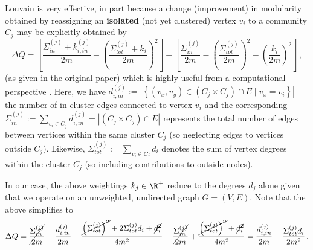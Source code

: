 \documentclass[12pt, a4paper]{article}
\begin{document}
  Louvain is very effective, in part because a change (improvement) in modularity obtained by reassigning an \textbf{isolated} (not yet clustered) vertex $v_i$ to a community $C_j$ may be explicitly obtained by
  \begin{equation}
    \Delta Q=\left[ \frac{\Sigma_{in}^{(j)} + k_{i,in}^{(j)}}{2 m} - \left(\frac{\Sigma_{tot}^{(j)} + k_{i}}{2m}\right)^2 \right] - \left[ \frac{\Sigma_{in}^{(j)}}{2m} - \left(\frac{\Sigma_{tot}^{(j)}}{2m}\right)^2 - \left(\frac{k_i}{2m}\right)^2 \right] \,,
    \label{eq:blondel-deltaQ}
  \end{equation}
  (as given in the original paper) which is highly useful from a computational perspective \parencite{lambiotte-louvain-clustering}.
  Here, we have $d_{i,in}^{(j)} := \left|\left\{(v_x, v_y) \in (C_j \times C_j) \cap E \;\big|\; v_x = v_i\right\}\right|$ the number of in-cluster edges connected to vertex $v_i$ and the corresponding $\Sigma_{in}^{(j)} := \sum_{v_i \in C_j} d_{i,in}^{(j)} = \left|(C_j \times C_j) \cap E\right|$ represents the total number of edges between vertices within the same cluster $C_j$ (so neglecting edges to vertices outside $C_j$).
  Likewise, $\Sigma_{tot}^{(j)} := \sum_{v_i \in C_j} d_i$ denotes the sum of vertex degrees within the cluster $C_j$ (so including contributions to outside nodes).

  In our case, the above weightings $k_j \in \R^+$ reduce to the degrees $d_j$ alone given that we operate on an unweighted, undirected graph $G = (V, E)$. Note that the above  simplifies to
  \begin{equation}
    \Delta Q = \cancel{\frac{\Sigma_{in}^{(j)}}{2m}} + \frac{d_{i, in}^{(j)}}{2m} - \frac{\cancel{\left(\Sigma_{tot}^{(j)}\right)^2} + 2 \Sigma_{tot}^{(j)} d_i + \cancel{d_i^2}}{4m^2} - \cancel{\frac{\Sigma_{in}^{(j)}}{2m}} + \frac{\cancel{\left(\Sigma_{tot}^{(j)}\right)^2} + \cancel{d_i^2}}{4m^2} = \frac{d_{i, in}^{(j)}}{2m} - \frac{\Sigma_{tot}^{(j)} d_i}{2m^2} \,.
    \label{eq:blondel-deltaQ-simplified}
  \end{equation}
\end{document}
